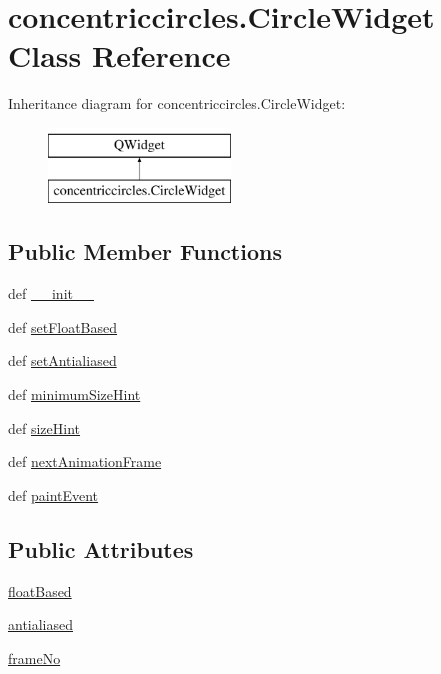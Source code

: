 \hypertarget{classconcentriccircles_1_1CircleWidget}{}\section{concentriccircles.\+Circle\+Widget Class Reference}
\label{classconcentriccircles_1_1CircleWidget}
Inheritance diagram for concentriccircles.\+Circle\+Widget\+:\begin{figure}[H]
\begin{center}
\leavevmode
\includegraphics[height=2.000000cm]{classconcentriccircles_1_1CircleWidget}
\end{center}
\end{figure}
\subsection*{Public Member Functions}
\begin{DoxyCompactItemize}
\item 
def \hyperlink{classconcentriccircles_1_1CircleWidget_aed4277eb280140eab22604f286745696}{\+\_\+\+\_\+init\+\_\+\+\_\+}
\item 
def \hyperlink{classconcentriccircles_1_1CircleWidget_ada20092fcb79da19150f14cab15dec53}{set\+Float\+Based}
\item 
def \hyperlink{classconcentriccircles_1_1CircleWidget_a8b46f82e23dce5e2cd01438ac399e747}{set\+Antialiased}
\item 
def \hyperlink{classconcentriccircles_1_1CircleWidget_a176b37370e654e68bbdab572283dc52e}{minimum\+Size\+Hint}
\item 
def \hyperlink{classconcentriccircles_1_1CircleWidget_a07548393104c578a8e81b3ea1c244293}{size\+Hint}
\item 
def \hyperlink{classconcentriccircles_1_1CircleWidget_af9528746c416f63041d3fcb30dc2725c}{next\+Animation\+Frame}
\item 
def \hyperlink{classconcentriccircles_1_1CircleWidget_a57ecfca6d40a960121f58a1846509786}{paint\+Event}
\end{DoxyCompactItemize}
\subsection*{Public Attributes}
\begin{DoxyCompactItemize}
\item 
\hyperlink{classconcentriccircles_1_1CircleWidget_a0eb245e6c43820b9b1d6fab933112ad5}{float\+Based}
\item 
\hyperlink{classconcentriccircles_1_1CircleWidget_a323ca3fdbfc4c99923cad99a084b4bb8}{antialiased}
\item 
\hyperlink{classconcentriccircles_1_1CircleWidget_ad7f75ace4c1c56de87bf39055d09038e}{frame\+No}
\end{DoxyCompactItemize}


